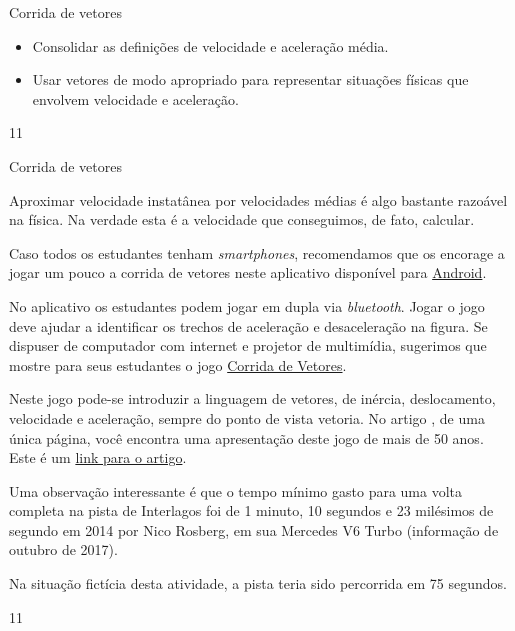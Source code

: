 \begin{objectives}{Corrida de vetores}
{
\begin{itemize}
\item {} 
Consolidar as definições de velocidade e aceleração média.

\item {} 
Usar vetores de modo apropriado para representar situações físicas que envolvem velocidade e aceleração.

\end{itemize}
}{1}{1}
\end{objectives}
\marginpar{\vspace{-2em}}
\begin{sugestions}{Corrida de vetores}
{
Aproximar velocidade instatânea por velocidades médias é algo bastante razoável na física. Na verdade esta é a velocidade que conseguimos, de fato, calcular.

Caso todos os estudantes tenham \textit{smartphones}, recomendamos que os encorage a jogar um pouco a corrida de vetores neste aplicativo disponível para \href{https://play.google.com/store/apps/details?id=zielanski.com.vectorrace\&hl=pt}{Android}.

No aplicativo os estudantes podem jogar em dupla via \textit{bluetooth}.
Jogar o jogo deve ajudar a identificar os trechos de aceleração e desaceleração na figura.
Se dispuser de computador com internet e projetor de multimídia, sugerimos que mostre para seus estudantes o jogo \href{http://www.harmmade.com/vectorracer/\#interlagos}{Corrida de Vetores}.

Neste jogo pode-se introduzir a linguagem de vetores, de inércia, deslocamento, velocidade e aceleração, sempre do ponto de vista vetoria.
No artigo \citep{oliveira2009}, de uma única página, você encontra uma apresentação deste jogo de mais de 50 anos.
Este é um \href{http://www.sbfisica.org.br/fne/Vol10/Num1/a08.pdf}{link para o artigo}.

Uma observação interessante é que o tempo mínimo gasto para uma volta completa na pista de Interlagos foi de 1 minuto, 10 segundos e 23 milésimos de segundo em 2014 por Nico Rosberg, em sua Mercedes V6 Turbo (informação de outubro de 2017).

Na situação fictícia desta atividade, a pista teria sido percorrida em 75 segundos.
}{1}{1}
\end{sugestions}


